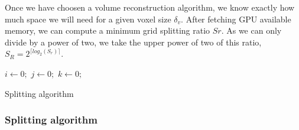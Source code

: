 \documentclass[12pt,journal,compsoc]{IEEEtran}
\begin{document}
Once we have choosen a volume reconstruction algorithm, we know exactly how much space we will need for a given voxel size $\delta_v$. After fetching GPU available memory, we can compute a minimum grid splitting ratio $Sr$. As we can only divide by a power of two, we take the upper power of two of this ratio,  $S_R = 2^{\lceil log_2(S_r) \rceil}$.

\begin{samepage}
\begin{algorithm}
\vspace{0.5cm} $i\gets0;$ $j\gets0;$ $k\gets0;$\\
\caption{Splitting algorithm}
\label{splitting}
\end{algorithm}
\end{samepage}

\subsubsection{Splitting algorithm}
\end{document}
